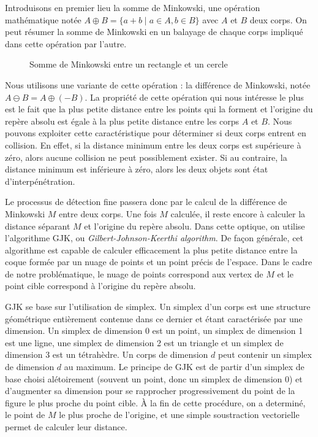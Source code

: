 Introduisons en premier lieu la somme de Minkowski, une opération
mathématique notée $A \oplus B = \{a + b \mid a \in A, b \in B\}$ avec
$A$ et $B$ deux corps. On peut résumer la somme de Minkowski en un
balayage de chaque corps impliqué dans cette opération par l'autre.

\begin{figure}
  
  \caption{Somme de Minkowski entre un rectangle et un cercle}
\end{figure}

Nous utilisons une variante de cette opération : la différence de
Minkowski, notée $A \ominus B = A \oplus (-B)$. La propriété de cette
opération qui nous intéresse le plus est le fait que la plus petite
distance entre les points qui la forment et l'origine du repère absolu
est égale à la plus petite distance entre les corps $A$ et $B$. Nous
pouvons exploiter cette caractéristique pour déterminer si deux corps
entrent en collision. En effet, si la distance minimum entre les deux
corps est supérieure à zéro, alors aucune collision ne peut
possiblement exister. Si au contraire, la distance minimum est
inférieure à zéro, alors les deux objets sont état d'interpénétration.

Le processus de détection fine passera donc par le calcul de la
différence de Minkowski $M$ entre deux corps. Une fois $M$ calculée,
il reste encore à calculer la distance séparant $M$ et l'origine du
repère absolu. Dans cette optique, on utilise l'algorithme GJK, ou
\textit{Gilbert-Johnson-Keerthi algorithm}. De façon générale, cet
algorithme est capable de calculer efficacement la plus petite
distance entre la coque formée par un nuage de points et un point
précis de l'espace. Dans le cadre de notre problématique, le nuage de
points correspond aux vertex de $M$ et le point cible correspond à
l'origine du repère absolu.

GJK se base sur l'utilisation de simplex. Un simplex d'un corps est
une structure géométrique entièrement contenue dans ce dernier et
étant caractérisée par une dimension. Un simplex de dimension 0 est un
point, un simplex de dimension 1 est une ligne, une simplex de
dimension 2 est un triangle et un simplex de dimension 3 est un
tétrahèdre. Un corps de dimension $d$ peut contenir un simplex de
dimension $d$ au maximum. Le principe de GJK est de partir d'un
simplex de base choisi alétoirement (souvent un point, donc un simplex
de dimension 0) et d'augmenter sa dimension pour se rapprocher
progressivement du point de la figure le plus proche du point
cible. \`A la fin de cette procédure, on a determiné, le point de $M$
le plus proche de l'origine, et une simple soustraction vectorielle
permet de calculer leur distance.


